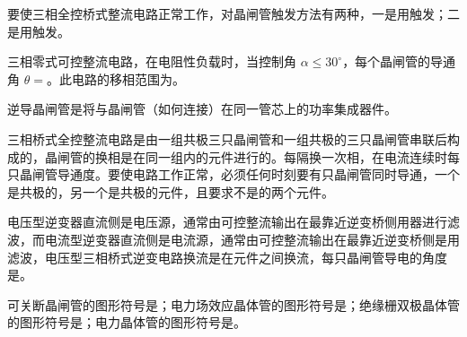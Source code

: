 \documentclass[电力电子]{subfiles}
\begin{document}
\begin{ti}
	要使三相全控桥式整流电路正常工作，对晶闸管触发方法有两种，一是用触发；二是用触发。
\end{ti}

\begin{ti}
	三相零式可控整流电路，在电阻性负载时，当控制角 $\alpha \leq 30^\circ$，每个晶闸管的导通角 $\theta = $。此电路的移相范围为。
\end{ti}

\begin{ti}
	逆导晶闸管是将与晶闸管（如何连接）在同一管芯上的功率集成器件。
\end{ti}

\begin{ti}
	三相桥式全控整流电路是由一组共极三只晶闸管和一组共极的三只晶闸管串联后构成的，晶闸管的换相是在同一组内的元件进行的。每隔换一次相，在电流连续时每只晶闸管导通度。要使电路工作正常，必须任何时刻要有只晶闸管同时导通，一个是共极的，另一个是共极的元件，且要求不是的两个元件。
\end{ti}

\begin{ti}
	电压型逆变器直流侧是电压源，通常由可控整流输出在最靠近逆变桥侧用器进行滤波，而电流型逆变器直流侧是电流源，通常由可控整流输出在最靠近逆变桥侧是用滤波，电压型三相桥式逆变电路换流是在元件之间换流，每只晶闸管导电的角度是。
\end{ti}

\begin{ti}
	可关断晶闸管的图形符号是；电力场效应晶体管的图形符号是；绝缘栅双极晶体管的图形符号是；电力晶体管的图形符号是。
\end{ti}
\end{document}
